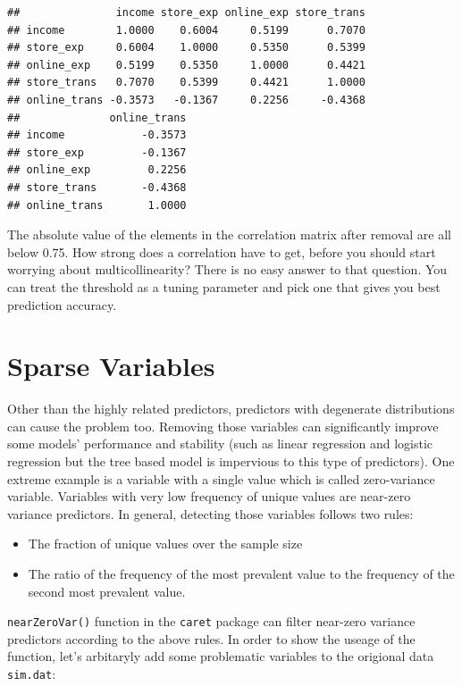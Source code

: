 \documentclass[12pt,]{krantz}
\providecommand{\tightlist}{%
  \setlength{\itemsep}{0pt}\setlength{\parskip}{0pt}}
\theoremstyle{definition}
\theoremstyle{definition}
\theoremstyle{definition}
\theoremstyle{remark}
\begin{document}
\begin{verbatim}
##               income store_exp online_exp store_trans
## income        1.0000    0.6004     0.5199      0.7070
## store_exp     0.6004    1.0000     0.5350      0.5399
## online_exp    0.5199    0.5350     1.0000      0.4421
## store_trans   0.7070    0.5399     0.4421      1.0000
## online_trans -0.3573   -0.1367     0.2256     -0.4368
##              online_trans
## income            -0.3573
## store_exp         -0.1367
## online_exp         0.2256
## store_trans       -0.4368
## online_trans       1.0000
\end{verbatim}

The absolute value of the elements in the correlation matrix after
removal are all below 0.75. How strong does a correlation have to get,
before you should start worrying about multicollinearity? There is no
easy answer to that question. You can treat the threshold as a tuning
parameter and pick one that gives you best prediction accuracy.

\section{Sparse Variables}\label{sparse-variables}

Other than the highly related predictors, predictors with degenerate
distributions can cause the problem too. Removing those variables can
significantly improve some models' performance and stability (such as
linear regression and logistic regression but the tree based model is
impervious to this type of predictors). One extreme example is a
variable with a single value which is called zero-variance variable.
Variables with very low frequency of unique values are near-zero
variance predictors. In general, detecting those variables follows two
rules:

\begin{itemize}
\tightlist
\item
  The fraction of unique values over the sample size
\item
  The ratio of the frequency of the most prevalent value to the
  frequency of the second most prevalent value.
\end{itemize}

\texttt{nearZeroVar()} function in the \texttt{caret} package can filter
near-zero variance predictors according to the above rules. In order to
show the useage of the function, let's arbitaryly add some problematic
variables to the origional data \texttt{sim.dat}:
\end{document}
